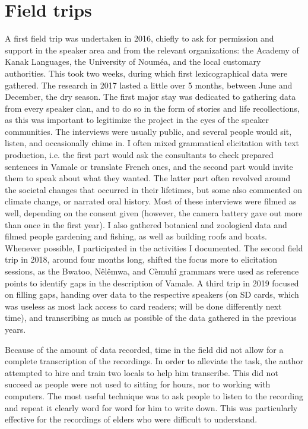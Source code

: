 \section{Field trips}
A first field trip was undertaken in 2016, chiefly to ask for permission and support in the speaker area and from the relevant organizations: the Academy of Kanak Languages, the University of Nouméa, and the local customary authorities. This took two weeks, during which first lexicographical data were gathered. The research in 2017 lasted a little over 5 months, between June and December, the dry season. The first major stay was dedicated to gathering data from every speaker clan, and to do so in the form of stories and life recollections, as this was important to legitimize the project in the eyes of the speaker communities. The interviews were usually public, and several people would sit, listen, and occasionally chime in. I often mixed grammatical elicitation with text production, i.e. the first part would ask the consultants to check prepared sentences in Vamale or translate French ones, and the second part would invite them to speak about what they wanted. The latter part often revolved around the societal changes that occurred in their lifetimes, but some also commented on climate change, or narrated oral history. Most of these interviews were filmed as well, depending on the consent given (however, the camera battery gave out more than once in the first year). I also gathered botanical and zoological data and filmed people gardening and fishing, as well as building roofs and boats. Whenever possible, I participated in the activities I documented. The second field trip in 2018, around four months long, shifted the focus more to elicitation sessions, as the Bwatoo, Nêlêmwa, and Cèmuhî grammars were used as reference points to identify gaps in the description of Vamale. A third trip in 2019 focused on filling gaps, handing over data to the respective speakers (on SD cards, which was useless as most lack access to card readers; will be done differently next time), and transcribing as much as possible of the data gathered in the previous years. 


%

Because of the amount of data recorded, time in the field did not allow for a complete transcription of the recordings. In order to alleviate the task, the author attempted to hire and train two locals to help him transcribe. This did not succeed as people were not used to sitting for hours, nor to working with computers. The most useful technique was to ask people to listen to the recording and repeat it clearly word for word for him to write down. This was particularly effective for the recordings of elders who were difficult to understand.

